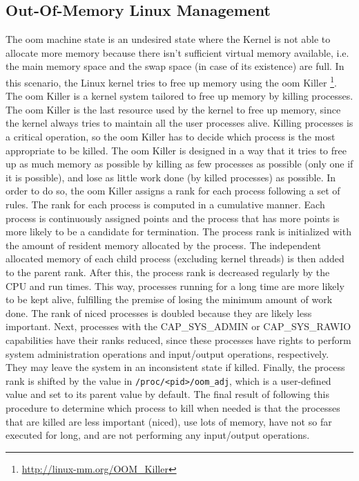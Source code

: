 \subsection{Out-Of-Memory Linux Management}\label{subme_oom}
The \gls{oom} machine state is an undesired state where the Kernel is not able to allocate
more memory because there isn’t sufficient virtual memory available, i.e. the main memory
space and the swap space (in case of its existence) are full. In this scenario, the Linux
kernel tries to free up memory using the \gls{oom} Killer \footnote{\url{http://linux-mm.org/OOM_Killer}}. The \gls{oom} Killer is a
kernel system tailored to free up memory by killing processes. The \gls{oom} Killer is the
last resource used by the kernel to free up memory, since the kernel always tries to
maintain all the user processes alive. Killing processes is a critical operation, so the
\gls{oom} Killer has to decide which process is the most appropriate to be killed. The
\gls{oom} Killer is designed in a way that it tries to free up as much memory as possible
by killing as few processes as possible (only one if it is possible), and lose as little
work done (by killed processes) as possible. In order to do so, the \gls{oom} Killer
assigns a rank for each process following a set of rules. The rank for each process
is computed in a cumulative manner. Each process is continuously assigned points and
the process that has more points is more likely to be a candidate for termination. The
process rank is initialized with the amount of resident memory allocated by the process.
The independent allocated memory of each child process (excluding kernel threads) is then
added to the parent rank. After this, the process rank is decreased regularly by the CPU
and run times. This way, processes running for a long time are more likely to be kept alive,
fulfilling the premise of losing the minimum amount of work done. The rank of niced processes
is doubled because they are likely less important. Next, processes with the CAP\_SYS\_ADMIN or
CAP\_SYS\_RAWIO capabilities have their ranks reduced, since these processes have rights
to perform system administration operations and input/output operations, respectively.
They may leave the system in an inconsistent state if killed. Finally, the process rank is
shifted by the value in \texttt{/proc/<pid>/oom\_adj}, which is a user-defined value and
set to its parent value by default. The final result of following this procedure to determine
which process to kill when needed is that the processes that are killed are less important
(niced), use lots of memory, have not so far executed for long, and are not performing
any input/output operations.

